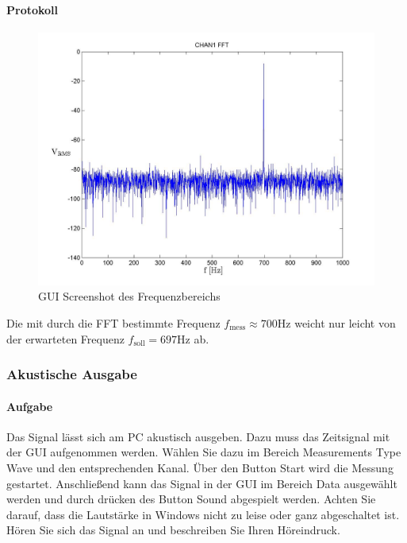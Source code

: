 \documentclass[10pt]{scrreprt}
\begin{document}
        \paragraph{Protokoll}
        \begin{center}
            \begin{figure}[H]
                \includegraphics[width=\textwidth]{Screenshot_GUI_4121_chan1_fft.jpg}
              \caption{GUI Screenshot des Frequenzbereichs}
            \end{figure}
        \end{center}

        Die mit durch die FFT bestimmte Frequenz $f_\text{mess} \approx 700\si{\hertz}$
        weicht nur leicht von der erwarteten Frequenz $f_\text{soll} = 697 \si{\hertz}$
        ab.


        \subsubsection{Akustische Ausgabe}
        \paragraph{Aufgabe}
        Das Signal lässt sich am PC akustisch ausgeben. Dazu muss das Zeitsignal mit
        der GUI aufgenommen werden. Wählen Sie dazu im Bereich Measurements Type
        \glqq{}Wave\grqq{} und den entsprechenden Kanal. Über den Button \glqq{}Start\grqq{} wird die Messung
        gestartet. Anschließend kann das Signal in der GUI im Bereich \glqq{}Data\grqq{} ausgewählt
        werden und durch drücken des Button \glqq{}Sound\grqq{} abgespielt werden. Achten Sie darauf,
        dass die Lautstärke in Windows nicht zu leise oder ganz abgeschaltet ist. Hören
        Sie sich das Signal an und beschreiben Sie Ihren Höreindruck.
\end{document}
